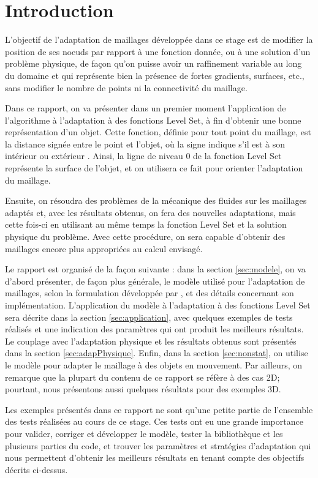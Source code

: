 \section{Introduction}

\indent L'objectif de l'adaptation de maillages développée dans ce stage est de modifier la position de ses noeuds par rapport à une fonction donnée, ou à une solution d'un problème physique, de façon qu'on puisse avoir un raffinement variable au long du domaine et qui représente bien la présence de fortes gradients, surfaces, etc., sans modifier le nombre de points ni la connectivité du maillage.

\indent Dans ce rapport, on va présenter dans un premier moment l'application de l'algorithme à l'adaptation à des fonctions Level Set, à fin d'obtenir une bonne représentation d'un objet. Cette fonction, définie pour tout point du maillage, est la distance signée entre le point et l'objet, où la signe indique s'il est à son intérieur ou extérieur \cite{ducrot}. Ainsi, la ligne de niveau 0 de la fonction Level Set représente la surface de l'objet, et on utilisera ce fait pour orienter l'adaptation du maillage.

\indent Ensuite, on résoudra des problèmes de la mécanique des fluides sur les maillages adaptés et, avec les résultats obtenus, on fera des nouvelles adaptations, mais cette fois-ci en utilisant au même temps la fonction Level Set et la solution physique du problème. Avec cette procédure, on sera capable d'obtenir des maillages encore plus appropriées au calcul envisagé. 

\indent Le rapport est organisé de la façon suivante : dans la section \ref{sec:modele}, on va d'abord présenter, de façon plus générale, le modèle utilisé pour l'adaptation de maillages, selon la formulation développée par \cite{arpaia}, et des détails concernant son implémentation. L'application du modèle à l'adaptation à des fonctions Level Set sera décrite dans la section \ref{sec:application}, avec quelques exemples de tests réalisés et une indication des paramètres qui ont produit les meilleurs résultats. Le couplage avec l'adaptation physique et les résultats obtenus sont présentés dans la section \ref{sec:adapPhysique}. Enfin, dans la section \ref{sec:nonstat}, on utilise le modèle pour adapter le maillage à des objets en mouvement. Par ailleurs, on remarque que la plupart du contenu de ce rapport se réfère à des cas 2D; pourtant, nous présentons aussi quelques résultats pour des exemples 3D.

\indent Les exemples présentés dans ce rapport ne sont qu'une petite partie de l'ensemble des tests réalisées au cours de ce stage. Ces tests ont eu une grande importance pour valider, corriger et développer le modèle, tester la bibliothèque et les plusieurs parties du code, et trouver les paramètres et stratégies d'adaptation qui nous permettent d'obtenir les meilleurs résultats en tenant compte des objectifs décrits ci-dessus.
 